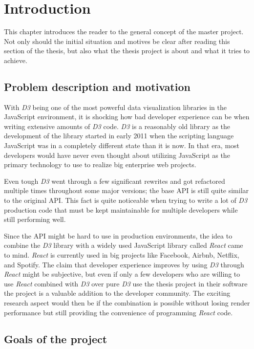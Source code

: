 \chapter{Introduction}
\label{cha:Introduction}

This chapter introduces the reader to the general concept of the master project. Not only should the initial situation and motives be clear after reading this section of the thesis, but also what the thesis project is about and what it tries to achieve.

\section{Problem description and motivation}

With \emph{D3} being one of the most powerful data visualization libraries in the JavaScript environment, it is shocking how bad developer experience can be when writing extensive amounts of \emph{D3} code. \emph{D3} is a reasonably old library as the development of the library started in early 2011 when the scripting language JavaScript was in a completely different state than it is now. In that era, most developers would have never even thought about utilizing JavaScript as the primary technology to use to realize big enterprise web projects. 

Even tough \emph{D3} went through a few significant rewrites and got refactored multiple times throughout some major versions; the base API is still quite similar to the original API. This fact is quite noticeable when trying to write a lot of \emph{D3} production code that must be kept maintainable for multiple developers while still performing well.

Since the API might be hard to use in production environments, the idea to combine the \emph{D3} library with a widely used JavaScript library called \emph{React} came to mind. \emph{React} is currently used in big projects like Facebook, Airbnb, Netflix, and Spotify. The claim that developer experience improves by using \emph{D3} through \emph{React} might be subjective, but even if only a few developers who are willing to use \emph{React} combined with \emph{D3} over pure \emph{D3} use the thesis project in their software the project is a valuable addition to the developer community. The exciting research aspect would then be if the combination is possible without losing render performance but still providing the convenience of programming \emph{React} code.

\section{Goals of the project}

